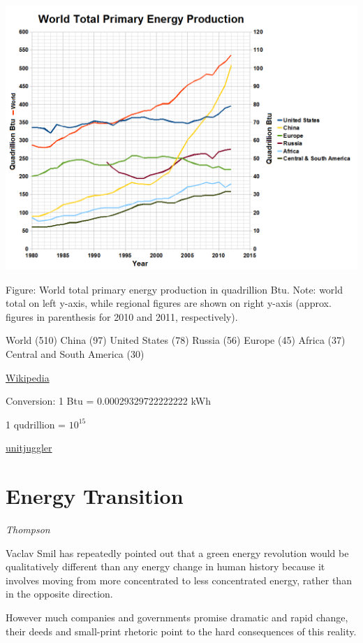 \documentclass[
]{book}
\begin{document}
\includegraphics{fig/WP_World_total_primary_energy_production.png}

Figure: World total primary energy production in quadrillion Btu.
Note: world total on left y-axis, while
regional figures are shown on right y-axis
(approx. figures in parenthesis for 2010 and 2011, respectively).

World (510)
China (97)
United States (78)
Russia (56)
Europe (45)
Africa (37)
Central and South America (30)

\href{https://en.wikipedia.org/wiki/Energy_development}{Wikipedia}

Conversion:
1 Btu = 0.00029329722222222 kWh

1 qudrillion = \(10^{15}\)

\href{https://www.unitjuggler.com/convert-energy-from-Btu-to-kWh.html}{unitjuggler}

\hypertarget{energy-transition}{%
\chapter{Energy Transition}\label{energy-transition}}

\emph{Thompson}

Vaclav Smil has repeatedly pointed out that
a green energy revolution would be qualitatively different than any energy change in human history
because it involves moving from more concentrated to less concentrated energy,
rather than in the opposite direction.

However much companies and governments promise dramatic and rapid change, their deeds and small-print rhetoric point to the hard consequences of this reality.
\end{document}
